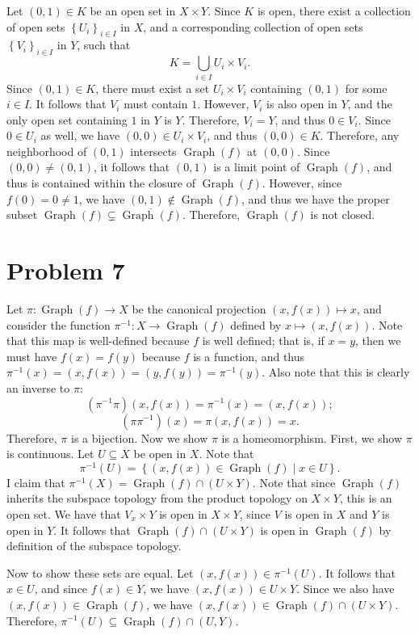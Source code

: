 \documentclass[11pt, letterpaper]{article}
\DeclareMathOperator{\Graph}{Graph}
\begin{document}
Let $(0,1)\in K$ be an open set in $X\times Y$. Since $K$ is open, there exist a collection of open sets $\left\{ U_i \right\}_{i\in I} $ in $X$, and a corresponding collection of open sets $\left\{ V_i \right\}_{i\in I} $ in $Y$, such that
\[
	K=\bigcup_{i\in I} U_i \times V_i
.\]
Since $(0,1)\in K$, there must exist a set $U_i\times V_i$ containing $(0,1)$ for some $i\in I$. It follows that $V_i$ must contain $1$. However, $V_i$ is also open in $Y$, and the only open set containing $1$ in $Y$ is $Y$. Therefore, $V_i=Y$, and thus $0\in V_i$. Since $0\in U_i$ as well, we have $(0,0)\in U_i\times V_i$, and thus $(0,0)\in K$. Therefore, any neighborhood of $(0,1)$ intersects $\Graph(f)$ at $(0,0)$. Since $(0,0)\neq (0,1)$, it follows that $(0,1)$ is a limit point of $\Graph(f)$, and thus is contained within the closure of $\Graph(f)$. However, since $f(0)=0\neq 1$, we have $(0,1)\notin \Graph(f)$, and thus we have the proper subset $\Graph(f)\subsetneq \overline{\Graph(f)} $. Therefore, $\Graph(f)$ is not closed.

\section*{Problem 7}
Let $\pi : \Graph(f) \to X$ be the canonical projection $(x,f(x))\mapsto x$, and consider the function $\pi ^{-1} : X \to \Graph(f)$ defined by $x\mapsto (x,f(x))$. Note that this map is well-defined because $f$ is well defined; that is, if $x=y$, then we must have $f(x)=f(y)$ because $f$ is a function, and thus $\pi ^{-1} (x)=(x,f(x))=(y,f(y))=\pi ^{-1} (y)$. Also note that this is clearly an inverse to $\pi $:
\[
	\left( \pi ^{-1} \pi  \right) (x,f(x))=\pi ^{-1} (x)=(x,f(x));
\]
\[
	\left( \pi \pi ^{-1}  \right) (x)=\pi (x,f(x))=x
.\]
Therefore, $\pi $ is a bijection. Now we show $\pi $ is a homeomorphism. First, we show $\pi $ is continuous. Let $U \subseteq X$ be open in $X$. Note that
\[
	\pi ^{-1} (U)=\left\{ (x,f(x))\in \Graph(f)\mid x\in U \right\} 
.\]
I claim that $\pi ^{-1} (X)=\Graph(f) \cap (U \times Y)$. Note that since $\Graph(f)$ inherits the subspace topology from the product topology on $X\times Y$, this is an open set. We have that $V_x\times Y$ is open in $X\times Y$, since $V$ is open in $X$ and $Y$ is open in $Y$. It follows that $\Graph(f) \cap (U \times Y)$ is open in $\Graph(f)$ by definition of the subspace topology.

Now to show these sets are equal. Let $(x,f(x))\in \pi ^{-1} (U)$. It follows that $x\in U$, and since $f(x)\in Y$, we have $(x,f(x))\in U\times Y$. Since we also have $(x,f(x))\in \Graph(f)$, we have $(x,f(x))\in \Graph(f)\cap (U\times Y)$. Therefore, $\pi ^{-1} (U)\subseteq \Graph(f)\cap (U,Y)$.
\end{document}
